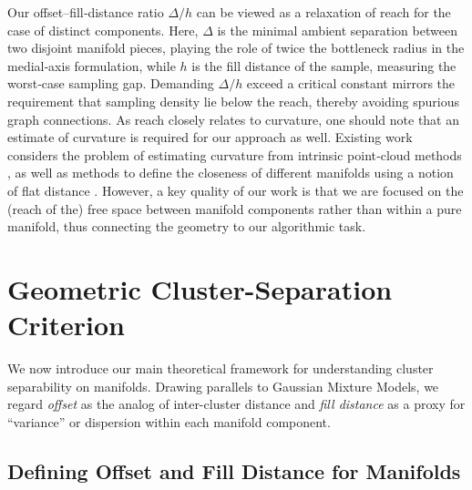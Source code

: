 \documentclass{article}
\theoremstyle{plain}
\theoremstyle{definition}
\theoremstyle{remark}
\begin{document}
Our offset–fill‑distance ratio \(\Delta/h\) can be viewed as a relaxation of reach for the case of distinct components.  Here, \(\Delta\) is the minimal ambient separation between two disjoint manifold pieces, playing the role of twice the bottleneck radius in the medial‑axis formulation, while \(h\) is the fill distance of the sample, measuring the worst‑case sampling gap. Demanding \(\Delta/h\) exceed a critical constant mirrors the requirement that sampling density lie below the reach, thereby avoiding spurious graph connections. As reach closely relates to curvature, one should note that an estimate of curvature is required for our approach as well. Existing work considers the problem of estimating curvature from intrinsic point‑cloud methods \cite{hickok2023intrinsic}, as well as methods to define the closeness of different manifolds using a notion of flat distance \cite{sormani2011intrinsic}. However, a key quality of our work is that we are focused on the (reach of the) free space between manifold components rather than within a pure manifold, thus connecting the geometry to our algorithmic task.






\section{Geometric Cluster-Separation Criterion}
\label{sec:geom-criterion}

We now introduce our main theoretical framework for understanding cluster separability on manifolds. Drawing parallels to Gaussian Mixture Models, we regard \emph{offset} as the analog of inter-cluster distance and \emph{fill distance} as a proxy for “variance” or dispersion within each manifold component.

\subsection{Defining Offset and Fill Distance for Manifolds}
\label{sec:offset-fill-definition}
\end{document}

